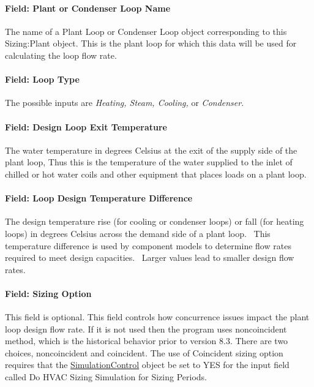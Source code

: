 \paragraph{Field: Plant or Condenser Loop Name}\label{field-plant-or-condenser-loop-name}

The name of a Plant Loop or Condenser Loop object corresponding to this Sizing:Plant object. This is the plant loop for which this data will be used for calculating the loop flow rate.

\paragraph{Field: Loop Type}\label{field-loop-type}

The possible inputs are \emph{Heating, Steam, Cooling,} or \emph{Condenser}.

\paragraph{Field: Design Loop Exit Temperature}\label{field-design-loop-exit-temperature}

The water temperature in degrees Celsius at the exit of the supply side of the plant loop, Thus this is the temperature of the water supplied to the inlet of chilled or hot water coils and other equipment that places loads on a plant loop.

\paragraph{Field: Loop Design Temperature Difference}\label{field-loop-design-temperature-difference}

The design temperature rise (for cooling or condenser loops) or fall (for heating loops) in degrees Celsius across the demand side of a plant loop.~ This temperature difference is used by component models to determine flow rates required to meet design capacities.~ Larger values lead to smaller design flow rates.

\paragraph{Field: Sizing Option}\label{field-sizing-option}

This field is optional. This field controls how concurrence issues impact the plant loop design flow rate. If it is not used then the program uses noncoincident method, which is the historical behavior prior to version 8.3. There are two choices, noncoincident and coincident. The use of Coincident sizing option requires that the \hyperref[simulationcontrol]{SimulationControl} object be set to YES for the input field called Do HVAC Sizing Simulation for Sizing Periods.

